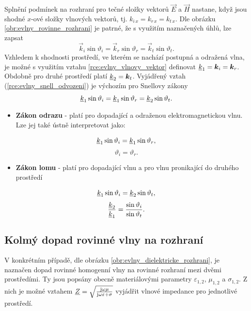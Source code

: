 Splnění podmínek na rozhraní pro tečné složky vektorů $\vec E$ a $\vec H$ nastane, když jsou shodné $x$-ové složky vlnových vektorů, tj. $k_{i\,x} = k_{r\,x} = k_{t\,x}$. Dle obrázku \ref{obr:evlny_rovinne_rozhrani} je patrné, že s využitím naznačených úhlů, lze zapsat
\begin{displaymath}
	\vec k_{i}\sin\vartheta_{i} = \vec k_{r}\sin\vartheta_{r} = \vec k_{t}\sin\vartheta_{t}.
\end{displaymath}
Vzhledem k shodnosti prostředí, ve kterém se nachází postupná a odražená vlna, je možné s využitím vztahu \ref{rce:evlny_vlnovy_vektor} definovat ${\underline{k}}_{1} = \mbox{\boldmath$k$}_{i} = \mbox{\boldmath$k$}_{r}$. Obdobně pro druhé prostředí platí ${\underline{k}}_{2} = \mbox{\boldmath$k$}_{t}$. Vyjádřený vztah (\ref{rce:evlny_snell_odvozeni}) je výchozím pro Snellovy zákony
\begin{equation}
	{\underline{k}}_{1}\sin\vartheta_{i} = {\underline{k}}_{1}\sin\vartheta_{r} = {\underline{k}}_{2}\sin\vartheta_{t}.
	\label{rce:evlny_snell_odvozeni}
\end{equation}
\begin{itemize}
\item {\bf Zákon odrazu} - platí pro dopadající a odraženou elektromagnetickou vlnu. Lze jej také ústně interpretovat jako: 
\end{itemize}
\begin{displaymath}
	{\underline{k}}_{1}\sin\vartheta_{i} = {\underline{k}}_{1}\sin\vartheta_{r},
\end{displaymath}
\begin{equation}
	\vartheta_{i} = \vartheta_{r}.
	\label{rce:evlny_zakon_odrazu}
\end{equation}
\begin{itemize}
\item {\bf Zákon lomu} - platí pro dopadající vlnu a pro vlnu pronikající do druhého prostředí
\end{itemize}
\begin{displaymath}
	{\underline{k}}_{1}\sin\vartheta_{i} = {\underline{k}}_{2}\sin\vartheta_{t},
\end{displaymath}
\begin{equation}
	\frac{{\underline{k}}_{2}}{{\underline{k}}_{1}} = \frac{\sin\vartheta_{i}}{\sin\vartheta_{t}}.
	\label{rce:evlny_zakon_lomu}
\end{equation}

\subsection{Kolmý dopad rovinné vlny na rozhraní} \label{subsec:kolmy_dopad}
V konkrétním případě, dle obrázku \ref{obr:evlny_dielektricke_rozhrani}, je naznačen dopad rovinné homogenní vlny na rovinné rozhraní mezi dvěmi prostředími. Ty jsou popsány obecně materiálovými parametry $\varepsilon_{1,2}$, $\mu_{1,2}$ a $\sigma_{1,2}$. Z nich je možné vztahem ${\underline{Z}}=\sqrt{\frac{\mathrm{j}\omega\mu}{\mathrm{j}\omega\varepsilon + \sigma}}$ vyjádřit vlnové impedance pro jednotlivé prostředí.

